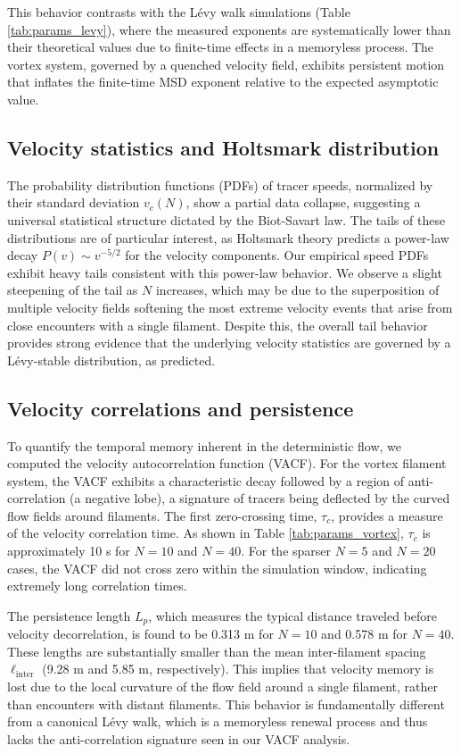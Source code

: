\documentclass[]{article}
\begin{document}
This behavior contrasts with the L\'evy walk simulations (Table \ref{tab:params_levy}), where the measured exponents are systematically lower than their theoretical values due to finite-time effects in a memoryless process. The vortex system, governed by a quenched velocity field, exhibits persistent motion that inflates the finite-time MSD exponent relative to the expected asymptotic value.

\subsection{Velocity statistics and Holtsmark distribution}

The probability distribution functions (PDFs) of tracer speeds, normalized by their standard deviation $v_c(N)$, show a partial data collapse, suggesting a universal statistical structure dictated by the Biot-Savart law. The tails of these distributions are of particular interest, as Holtsmark theory predicts a power-law decay $P(v) \sim v^{-5/2}$ for the velocity components. Our empirical speed PDFs exhibit heavy tails consistent with this power-law behavior. We observe a slight steepening of the tail as $N$ increases, which may be due to the superposition of multiple velocity fields softening the most extreme velocity events that arise from close encounters with a single filament. Despite this, the overall tail behavior provides strong evidence that the underlying velocity statistics are governed by a L\'evy-stable distribution, as predicted.

\subsection{Velocity correlations and persistence}

To quantify the temporal memory inherent in the deterministic flow, we computed the velocity autocorrelation function (VACF). For the vortex filament system, the VACF exhibits a characteristic decay followed by a region of anti-correlation (a negative lobe), a signature of tracers being deflected by the curved flow fields around filaments. The first zero-crossing time, $\tau_c$, provides a measure of the velocity correlation time. As shown in Table \ref{tab:params_vortex}, $\tau_c$ is approximately 10 s for $N=10$ and $N=40$. For the sparser $N=5$ and $N=20$ cases, the VACF did not cross zero within the simulation window, indicating extremely long correlation times.

The persistence length $L_p$, which measures the typical distance traveled before velocity decorrelation, is found to be 0.313 m for $N=10$ and 0.578 m for $N=40$. These lengths are substantially smaller than the mean inter-filament spacing $\ell_{\text{inter}}$ (9.28 m and 5.85 m, respectively). This implies that velocity memory is lost due to the local curvature of the flow field around a single filament, rather than encounters with distant filaments. This behavior is fundamentally different from a canonical L\'evy walk, which is a memoryless renewal process and thus lacks the anti-correlation signature seen in our VACF analysis.
\end{document}
